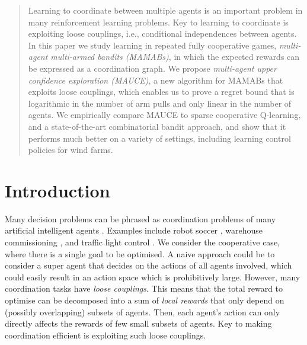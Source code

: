 \documentclass{article}
\begin{document}
\begin{abstract}
Learning to coordinate between multiple agents is an important problem in many reinforcement
learning problems. Key to learning to coordinate is exploiting loose couplings, i.e., conditional
independences between agents. In this paper we study learning in repeated fully cooperative games,
\emph{multi-agent multi-armed bandits (MAMABs)}, in which the expected rewards can be expressed as a
coordination graph. We propose \emph{multi-agent upper confidence exploration (MAUCE)}, a new
algorithm for MAMABs that exploits loose couplings, which enables us to prove a regret bound that is
logarithmic in the number of arm pulls and only linear in the number of agents. We empirically
compare MAUCE to sparse cooperative Q-learning, and a state-of-the-art combinatorial bandit
approach, and show that it performs much better on a variety of settings, including learning control
policies for wind farms.

\end{abstract}

\section{Introduction}
Many decision problems can be phrased as coordination problems of many artificial intelligent agents
\cite{boutilier1996mmdp}. Examples include robot soccer \cite{kok2003multi}, warehouse commissioning
\cite{claes2017decentralised}, and traffic light control \cite{wiering2000multi}.  We consider the
cooperative case, where there is a single goal to be optimised. A naive approach could be to consider
a super agent that decides on the actions of all agents involved, which could
easily result in an action space which is prohibitively large.
%
However, many coordination tasks have \emph{loose couplings}. This means that the total reward to
optimise can be decomposed into a sum of \emph{local rewards} that only depend on (possibly
overlapping) subsets of agents.  Then, each agent's action can only directly affects the rewards of
few small subsets of agents. Key to making coordination efficient is exploiting such loose
couplings.
\end{document}
